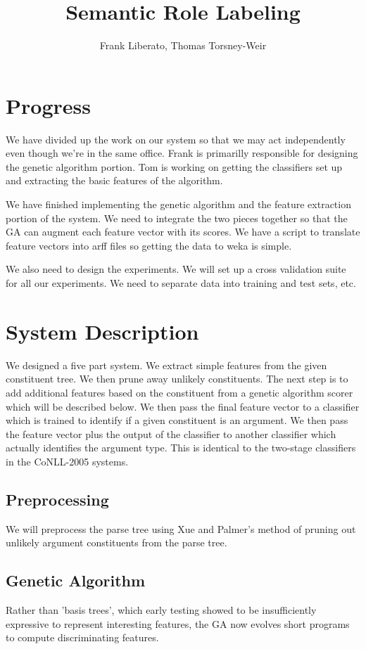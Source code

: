\documentclass{article}
\author{Frank Liberato, Thomas Torsney-Weir}
\title{Semantic Role Labeling}
\begin{document}
\maketitle

\section{Progress}
We have divided up the work on our system so that we may act independently
even though we're in the same office.  Frank is primarilly responsible for 
designing the genetic algorithm portion.  Tom is working on getting the 
classifiers set up and extracting the basic features of the algorithm.

We have finished implementing the genetic algorithm and the feature extraction
portion of the system.  We need to integrate the two pieces together so that
the GA can augment each feature vector with its scores.  We have a script to 
translate feature vectors into arff files so getting the data to weka is
simple.  

We also need to design the experiments.  We will set up a cross validation
suite for all our experiments.  We need to separate data into training and
test sets, etc.

\section{System Description}
We designed a five part system.  We extract simple features from the given
constituent tree.  We then prune away unlikely constituents.  The next step
is to add additional features based on the constituent from a genetic 
algorithm scorer which will be described below.  We then pass the final 
feature vector to a classifier which is trained to identify if a given
constituent is an argument.  We then pass the feature vector plus the output
of the classifier to another classifier which actually identifies the argument
type.  This is identical to the two-stage classifiers in the CoNLL-2005 
systems.

\subsection{Preprocessing}
We will preprocess the parse tree using Xue and Palmer's method of pruning
out unlikely argument constituents from the parse tree.

\subsection{Genetic Algorithm}
Rather than 'basis trees', which early testing showed to be insufficiently
expressive to represent interesting features, the GA now evolves short
programs to compute discriminating features.
\end{document}
